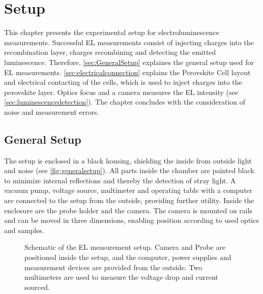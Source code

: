 \chapter{Setup}
This chapter presents the experimental setup for electroluminescence measurements. Successful EL measurements consist of injecting charges into the recombination layer, charges recombining and detecting the emitted luminescence. Therefore, \autoref{sec:GeneralSetup} explaines the general setup used for EL measurements. \autoref{sec:electricalconnection} explains the Perovskite Cell layout and electrical contacting of the cells, which is used to inject charges into the perovskite layer. Optics focus and a camera measures the EL intensity (see \autoref{sec:luminescencedetection}). The chapter concludes with the consideration of noise and measurement errors.

\section{General Setup}\label{sec:GeneralSetup}
The setup is enclosed in a black housing, shielding the inside from outside light and noise (see \autoref{fig:generalsetup}). All parts inside the chamber are painted black to minimize internal reflections and thereby the detection of stray light. A vacuum pump, voltage source, multimeter and operating table with a computer are connected to the setup from the outside, providing further utility. Inside the enclosure are the probe holder and the camera. The camera is mounted on rails and can be moved in three dimensions, enabling position according to used optics and samples.
\begin{figure}[h]
	\centering
	
	\caption{Schematic of the EL measurement setup. Camera and Probe are positioned inside the setup, and the computer, power supplies and measurement devices are provided from the outside. Two multimeters are used to measure the voltage drop and current sourced.}
	\label{fig:generalsetup}
\end{figure}
